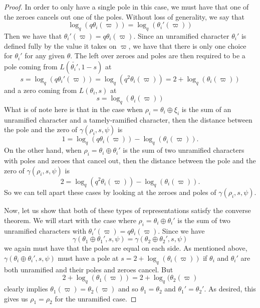 \begin{proof}
  In order to only have a single pole in this case, we must have that one of the zeroes cancels out one of the poles.
  Without loss of generality, we say that \[\log_q(q\theta_i(\varpi)) = \log_q(\theta_i'(\varpi))\]
  Then we have that $\theta_i'(\varpi) = q\theta_i(\varpi)$.
  Since an unramified character $\theta_i'$ is defined fully by the value it takes on $\varpi$, we have that there is only one choice for $\theta_i'$ for any given $\theta$.
  The left over zeroes and poles are then required to be a pole coming from $L(\check{\theta_i'},1-s)$ at 
  \[s = \log_q(q \theta_i'(\varpi)) = \log_q(q^2 \theta_i(\varpi)) = 2 + \log_q(\theta_i(\varpi))\]
  and a zero coming from $L(\theta_i,s)$ at
  \[s = \log_q(\theta_i(\varpi))\]
  What is of note here is that in the case when $\rho_i = \theta_i \oplus \xi_i$ is the sum of an unramified character and a tamely-ramified character, then the distance between the pole and the zero of $\gamma(\rho_i,s,\psi)$ is
  \[1 = \log_q(q\theta_i(\varpi)) - \log_q(\theta_i(\varpi)).\]
  On the other hand, when $\rho_i = \theta_i \oplus \theta_i'$ is the sum of two unramified characters with poles and zeroes that cancel out, then the distance between the pole and the zero of $\gamma(\rho_i,s,\psi)$ is
  \[2 = \log_q(q^2 \theta_i(\varpi)) - \log_q(\theta_i(\varpi)).\]
  So we can tell apart these cases by looking at the zeroes and poles of $\gamma(\rho_i,s,\psi)$.


  Now, let us show that both of these types of representations satisfy the converse theorem.
  We will start with the case where $\rho_i = \theta_i \oplus \theta_i'$ is the sum of two unramified characters with $\theta_i'(\varpi) = q \theta_i (\varpi)$.
  Since we have
  \[\gamma(\theta_1 \oplus \theta_1', s, \psi) = \gamma(\theta_2 \oplus \theta_2',s,\psi)\]
  we again must have that the poles are equal on each side.
  As mentioned above, $\gamma(\theta_i \oplus \theta_i' ,s, \psi)$ must have a pole at $s = 2 + \log_q(\theta_i(\varpi))$ if $\theta_i$ and $\theta_i'$ are both unramified and their poles and zeroes cancel.
  But \[2 + \log_q(\theta_1(\varpi)) = 2 + \log_q(\theta_2(\varpi)\]
  clearly implies $\theta_1(\varpi) = \theta_2(\varpi)$ and so $\theta_1 = \theta_2$ and $\theta_1' = \theta_2'$.
  As desired, this gives us $\rho_1 = \rho_2$ for the unramified case.


\end{proof}

